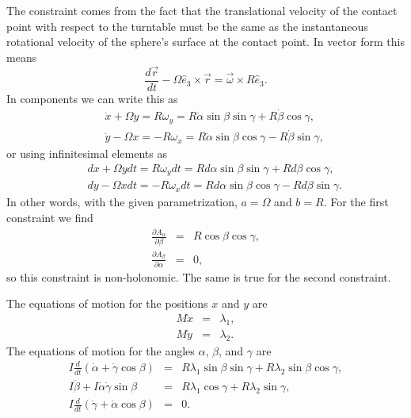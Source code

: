 \documentclass[letterpaper,11pt]{article}
\begin{document}
The constraint comes from the fact that the translational velocity of the contact point with respect to the turntable must be the same as the instantaneous rotational velocity of the sphere's surface at the contact point.  In vector form this means
\begin{equation*}
 \frac{d\vec{r}}{dt} - \Omega\hat{e}_3 \times \vec{r} = \vec{\omega} \times {R\hat{e}_3}.
\end{equation*}
In components we can write this as
\begin{eqnarray*}
 && \dot{x} + \Omega y = R \omega_y = R \dot\alpha \sin\beta \sin\gamma + R \dot\beta \cos\gamma, \\
 && \dot{y} - \Omega x = - R \omega_x = R \dot\alpha \sin\beta \cos\gamma - R \dot\beta \sin\gamma,
\end{eqnarray*}
or using infinitesimal elements as
\begin{eqnarray*}
 && dx + \Omega y dt = R \omega_y dt = R d\alpha \sin\beta \sin\gamma + R d\beta \cos\gamma, \\
 && dy - \Omega x dt = - R \omega_x dt = R d\alpha \sin\beta \cos\gamma - R d\beta \sin\gamma.
\end{eqnarray*}
In other words, with the given parametrization, $a = \Omega$ and $b = R$.  For the first constraint we find
\begin{eqnarray*}
 \frac{\partial A_\alpha}{\partial \beta} & = & R \cos\beta\cos\gamma, \\
 \frac{\partial A_\beta}{\partial \alpha} & = & 0,
\end{eqnarray*}
so this constraint is non-holonomic.  The same is true for the second constraint.

The equations of motion for the positions $x$ and $y$ are
\begin{eqnarray*}
 M \ddot{x} & = & \lambda_1, \\
 M \ddot{y} & = & \lambda_2.
\end{eqnarray*}
The equations of motion for the angles $\alpha$, $\beta$, and $\gamma$ are
\begin{eqnarray*}
 I \frac{d}{dt} \left( \dot\alpha + \dot\gamma \cos\beta \right) & = & R \lambda_1 \sin\beta \sin\gamma + R \lambda_2 \sin\beta \cos\gamma, \\
 I \ddot\beta + I \dot\alpha \dot\gamma \sin\beta & = & R \lambda_1 \cos\gamma + R \lambda_2 \sin\gamma, \\
 I \frac{d}{dt} \left( \dot\gamma + \dot\alpha \cos\beta \right) & = & 0.
\end{eqnarray*}
\end{document}
